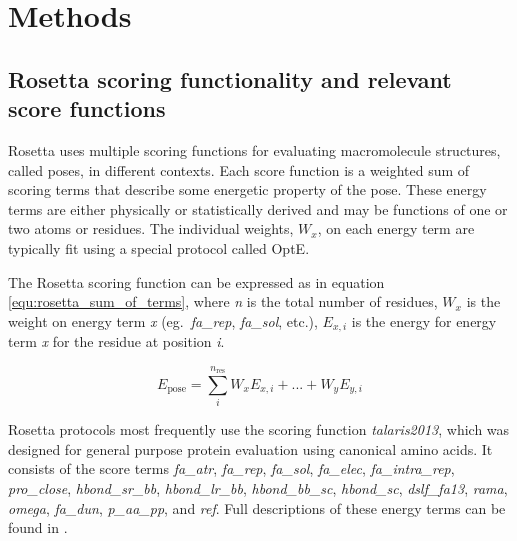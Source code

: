 \section{Methods}

\subsection{Rosetta scoring functionality and relevant score functions}
Rosetta uses multiple scoring functions for evaluating macromolecule structures, called poses, in different contexts.
Each score function is a weighted sum of scoring terms that describe some energetic property of the pose.
These energy terms are either physically or statistically derived and may be functions of one or two atoms or residues.
The individual weights, $W_x$, on each energy term are typically fit using a special protocol called OptE\cite{leaver-fay_chapter_2013}.

The Rosetta scoring function can be expressed as in equation \ref{equ:rosetta_sum_of_terms}, where \textit{n} is the total number of residues, $W_{x}$ is the weight on energy term \textit{x} (eg.\ \textit{fa\_rep}, \textit{fa\_sol}, etc.), $E_{x,i}$ is the energy for energy term \textit{x} for the residue at position \textit{i}.

\begin{equation}
  \label{equ:rosetta_sum_of_terms}
  E_{\text{pose}} = \sum_{i}^{n_{\text{res}}} W_{x} E_{x,i} + ... + W_{y} E_{y,i}
\end{equation}

Rosetta protocols most frequently use the scoring function \textit{talaris2013}, which was designed for general purpose protein evaluation using canonical amino acids\cite{leaver-fay_chapter_2013}.
It consists of the score terms \textit{fa\_atr}, \textit{fa\_rep}, \textit{fa\_sol}, \textit{fa\_elec}, \textit{fa\_intra\_rep}, \textit{pro\_close}, \textit{hbond\_sr\_bb}, \textit{hbond\_lr\_bb}, \textit{hbond\_bb\_sc}, \textit{hbond\_sc}, \textit{dslf\_fa13}, \textit{rama}, \textit{omega}, \textit{fa\_dun}, \textit{p\_aa\_pp}, and \textit{ref}.
Full descriptions of these energy terms can be found in \cite{leaver-fay_chapter_2013}.

